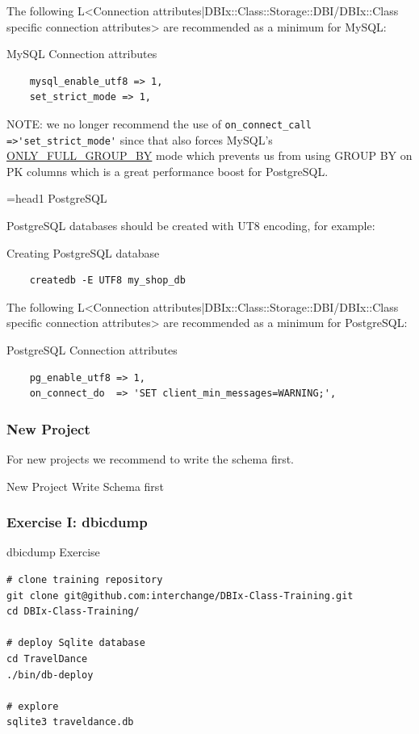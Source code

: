 The following L<Connection attributes|DBIx::Class::Storage::DBI/DBIx::Class specific connection attributes> are recommended as a minimum for MySQL:

\begin{frame}[fragile]{MySQL Connection attributes}
\begin{lstlisting}
    mysql_enable_utf8 => 1,
    set_strict_mode => 1,
\end{lstlisting}
\end{frame}

NOTE: we no longer recommend the use of 
\verb|on_connect_call =>'set_strict_mode'| since that also forces MySQL's 
\href{https://dev.mysql.com/doc/refman/5.0/en/sql-mode.html#sqlmode\_only\_full\_group\_by}{ONLY\_FULL\_GROUP\_BY} mode which prevents us from using GROUP BY on PK columns which is a great performance boost for PostgreSQL.

=head1 PostgreSQL

PostgreSQL databases should be created with UT8 encoding, for example:

\begin{frame}[fragile]{Creating PostgreSQL database}
\begin{lstlisting}
    createdb -E UTF8 my_shop_db
\end{lstlisting}
\end{frame}

The following L<Connection attributes|DBIx::Class::Storage::DBI/DBIx::Class specific connection attributes> are recommended as a minimum for PostgreSQL:

\begin{frame}[fragile]{PostgreSQL Connection attributes}
\begin{lstlisting}
    pg_enable_utf8 => 1,
    on_connect_do  => 'SET client_min_messages=WARNING;',
\end{lstlisting}
\end{frame}

\subsubsection{New Project}

For new projects we recommend to write the schema first.

\begin{frame}[fragile]{New Project}
Write Schema first
\end{frame}

\subsubsection{Exercise I: dbicdump}
\begin{frame}[fragile]{dbicdump Exercise}
\begin{lstlisting}
# clone training repository
git clone git@github.com:interchange/DBIx-Class-Training.git
cd DBIx-Class-Training/

# deploy Sqlite database
cd TravelDance
./bin/db-deploy

# explore
sqlite3 traveldance.db
\end{lstlisting}
\end{frame}

